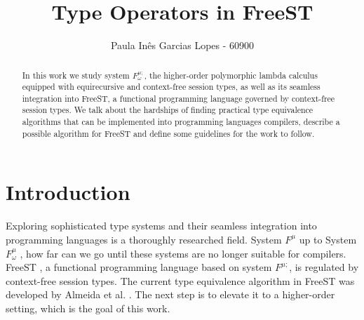 \documentclass[sigplan]{acmart}
\begin{document}
\title{Type Operators in FreeST} 

\author{Paula Inês Garcias Lopes - 60900}


\begin{abstract}
  In this work we study system $F^{\mu;}_\omega$, the higher-order polymorphic lambda calculus equipped with equirecursive and context-free session types, as well as its seamless integration into FreeST, a functional programming language governed by context-free session types. We talk about the hardships of finding practical type equivalence algorithms that can be implemented into programming languages compilers, describe a possible algorithm for FreeST and define some guidelines for the work to follow.
\end{abstract}



\pagestyle{plain} %

\maketitle
\section{Introduction} \label{sec:intro}

Exploring sophisticated type systems and their seamless integration into programming languages is a thoroughly researched field. System $F^\mu$ \cite{GauthierP04} up to System $F^\mu_\omega$ \cite{DBLP:conf/popl/CaiGO16}, how far can we go until these systems are no longer suitable for compilers.\\

FreeST \cite{AlmeidaMTV22}, a functional programming language based on system $F^{\mu;}$, is regulated by context-free session types. The current type equivalence algorithm in FreeST was developed by Almeida et al. \cite{AlmeidaMV20}. The next step is to elevate it to a higher-order setting, which is the goal of this work.\\
\end{document}

